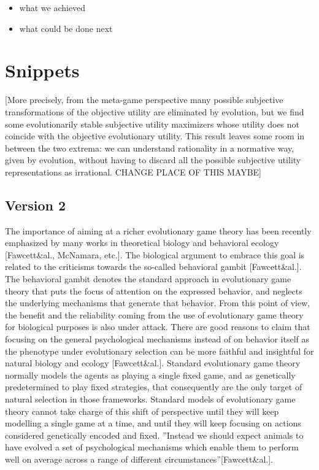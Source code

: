 \documentclass[fleqn,reqno,11pt]{article}
\begin{document}
\begin{itemize}
\item what we achieved
\item what could be done next
\end{itemize}




\printbibliography[heading=bibintoc]


\newpage

\section*{Snippets}

[More precisely, from the meta-game perspective many possible subjective
transformations of the objective utility are eliminated by evolution, but we find some
evolutionarily stable subjective utility maximizers whose utility does not coincide with the
objective evolutionary utility. This result leaves some room in between the two extrema: we can
understand rationality in a normative way, given by evolution, without having to discard all
the possible subjective utility representations as irrational. CHANGE PLACE OF THIS MAYBE]



\subsection{Version 2}

The importance of aiming at a richer evolutionary game theory has been recently emphasized by many works in theoretical biology and behavioral ecology [Fawcett\&al., McNamara, etc.]. The biological argument to embrace this goal is related to the criticisms towards the so-called behavioral gambit [Fawcett\&al.]. The behavioral gambit denotes the standard approach in evolutionary game theory that puts the focus of attention on the expressed behavior, and neglects the underlying mechanisms that generate that behavior. From this point of view, the benefit and the reliability coming from the use of evolutionary game theory for biological purposes is also under attack. There are good reasons to claim that focusing on the general psychological mechanisms instead of on behavior itself as the phenotype under evolutionary selection can be more faithful and insightful for natural biology and ecology [Fawcett\&al.].
Standard evolutionary game theory normally models the agents as playing a single fixed game, and as genetically predetermined to play fixed strategies, that consequently are the only target of natural selection in those frameworks. Standard models of evolutionary game theory cannot take charge of this shift of perspective until they will keep modelling a single game at a time, and until they will keep focusing on actions considered genetically encoded and fixed. ''Instead we should expect animals to have evolved a set of psychological mechanisms which enable them to perform well on average across a range of different circumstances''[Fawcett\&al.].
\end{document}
